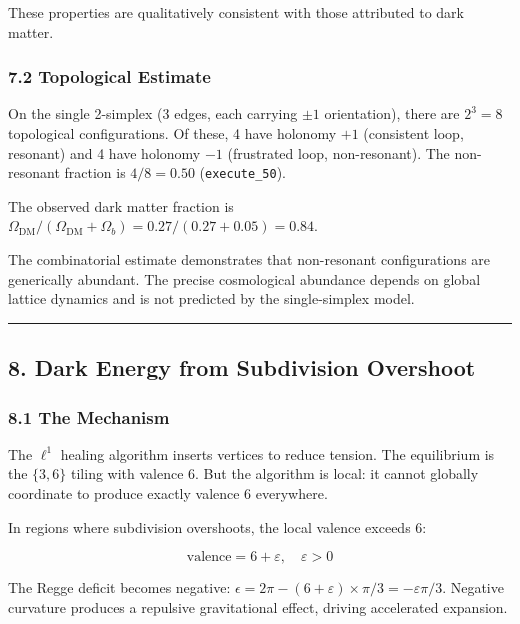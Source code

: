 \documentclass[
]{article}
\begin{document}
These properties are qualitatively consistent with those attributed to
dark matter.

\subsubsection{7.2 Topological Estimate}\label{topological-estimate}

On the single 2-simplex (3 edges, each carrying \(\pm 1\) orientation),
there are \(2^3 = 8\) topological configurations. Of these, 4 have
holonomy \(+1\) (consistent loop, resonant) and 4 have holonomy \(-1\)
(frustrated loop, non-resonant). The non-resonant fraction is
\(4/8 = 0.50\) (\texttt{execute\_50}).

The observed dark matter fraction is
\(\Omega_{\mathrm{DM}} / (\Omega_{\mathrm{DM}} + \Omega_b) = 0.27 / (0.27 + 0.05) = 0.84\).

The combinatorial estimate demonstrates that non-resonant configurations
are generically abundant. The precise cosmological abundance depends on
global lattice dynamics and is not predicted by the single-simplex
model.

\begin{center}\rule{0.5\linewidth}{0.5pt}\end{center}

\subsection{8. Dark Energy from Subdivision
Overshoot}\label{dark-energy-from-subdivision-overshoot}

\subsubsection{8.1 The Mechanism}\label{the-mechanism}

The \(\ell^1\) healing algorithm inserts vertices to reduce tension. The
equilibrium is the \(\{3,6\}\) tiling with valence 6. But the algorithm
is local: it cannot globally coordinate to produce exactly valence 6
everywhere.

In regions where subdivision overshoots, the local valence exceeds 6:

\[\text{valence} = 6 + \varepsilon, \quad \varepsilon > 0\]

The Regge deficit becomes negative:
\(\epsilon = 2\pi - (6 + \varepsilon) \times \pi/3 = -\varepsilon\pi/3\).
Negative curvature produces a repulsive gravitational effect, driving
accelerated expansion.
\end{document}

